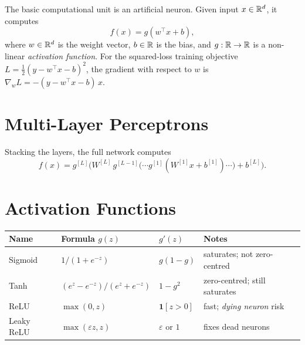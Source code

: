 \documentclass[oneside]{book}
\begin{document}
The basic computational unit is an artificial neuron.  Given input
$x \in \mathbb{R}^d$, it computes
\[
    f(x) = g(w^\top x + b),
\]
where $w \in \mathbb{R}^d$ is the weight vector, $b \in \mathbb{R}$ is the bias, and
$g:\mathbb{R}\to\mathbb{R}$ is a non-linear \emph{activation function}.  For the
squared-loss training objective $L = \tfrac{1}{2}(y - w^\top x - b)^2$,
the gradient with respect to $w$ is $\nabla_w L = -(y - w^\top x - b)\,x$.

\section{Multi-Layer Perceptrons}


Stacking the layers, the full network computes
\[
    f(x) = g^{[L]}\!\bigl(W^{[L]}\,g^{[L-1]}\!\bigl(\cdots
    g^{[1]}(W^{[1]} x + b^{[1]})\cdots\bigr) + b^{[L]}\bigr).
\]


\section{Activation Functions}

\begin{center}
\begin{tabular}{llll}
\hline
Name & Formula $g(z)$ & $g'(z)$ & Notes \\
\hline
Sigmoid     & $1/(1+e^{-z})$     & $g(1-g)$          & saturates; not zero-centred \\
Tanh        & $(e^z-e^{-z})/(e^z+e^{-z})$ & $1-g^2$ & zero-centred; still saturates \\
ReLU        & $\max(0,z)$        & $\mathbf{1}[z>0]$ & fast; \emph{dying neuron} risk \\
Leaky ReLU  & $\max(\varepsilon z,z)$ & $\varepsilon$ or $1$ & fixes dead neurons \\
\hline
\end{tabular}
\end{center}
\end{document}
